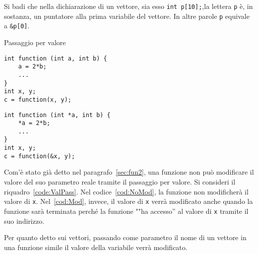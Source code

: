 Si badi che nella dichiarazione di un vettore, sia esso \lstinline!int p[10];!,la lettera \lstinline!p! è, in sostanza, un puntatore alla prima variabile del vettore. In altre parole \lstinline!p! equivale a \lstinline!&p[0]!.

\begin{code}
\centering
\caption{Passaggio per valore}
\label{code:ValPass}
	\begin{minipage}{0.45\columnwidth}
\begin{lstlisting}[caption={\em \lstinline!x! non viene modificato.},label={cod:NoMod},nolol]
int function (int a, int b) {
	a = 2*b;
	...
}
int x, y;
c = function(x, y);
\end{lstlisting}
	\end{minipage}	\hfill
	\begin{minipage}{0.5\columnwidth}
\begin{lstlisting}[caption={\em \lstinline!x! viene modificato.},label={cod:Mod},nolol]
int function (int *a, int b) {
	*a = 2*b;
	...
}
int x, y;
c = function(&x, y);
\end{lstlisting}
	\end{minipage}
\end{code}
Com'è stato già detto nel paragrafo~\vref{sec:fun2}, una funzione non può modificare il valore del suo parametro reale tramite il passaggio per valore. Si consideri il riquadro~\vref{code:ValPass}.
Nel codice~\ref{cod:NoMod}, la funzione non modificherà il valore di \lstinline!x!. Nel~\ref{cod:Mod}, invece, il valore di \lstinline!x! verrà modificato anche quando la funzione sarà terminata perché la funzione ""ha accesso'' al valore di \lstinline!x! tramite il suo indirizzo.

Per quanto detto sui vettori, passando come parametro il nome di un vettore in una funzione simile il valore della variabile verrà modificato.